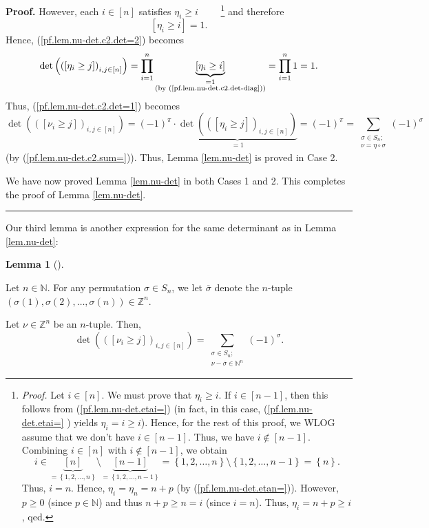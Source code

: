 \documentclass[numbers=enddot,12pt,final,onecolumn,notitlepage,english]{scrartcl}%
\theoremstyle{definition}
\newtheorem{lem}[theo]{Lemma}
\newenvironment{lemma}[1][]
{\begin{lem}[#1]\begin{leftbar}}
{\end{leftbar}\end{lem}}
\newenvironment{proof}[1][Proof]{\noindent\textbf{#1.} }{\ \rule{0.5em}{0.5em}}
\let\sumnonlimits\sum
\let\prodnonlimits\prod
\renewcommand{\sum}{\sumnonlimits\limits}
\renewcommand{\prod}{\prodnonlimits\limits}
\newenvironment{verlong}{}{}
\begin{document}
\begin{proof}
\begin{verlong}
However, each $i\in\left[  n\right]  $ satisfies $\eta_{i}\geq i$%
\ \ \ \ \footnote{\textit{Proof.} Let $i\in\left[  n\right]  $. We must prove
that $\eta_{i}\geq i$. If $i\in\left[  n-1\right]  $, then this follows from
(\ref{pf.lem.nu-det.etai=}) (in fact, in this case, (\ref{pf.lem.nu-det.etai=}%
) yields $\eta_{i}=i\geq i$). Hence, for the rest of this proof, we WLOG
assume that we don't have $i\in\left[  n-1\right]  $. Thus, we have
$i\notin\left[  n-1\right]  $. Combining $i\in\left[  n\right]  $ with
$i\notin\left[  n-1\right]  $, we obtain%
\[
i\in\underbrace{\left[  n\right]  }_{=\left\{  1,2,\ldots,n\right\}
}\setminus\underbrace{\left[  n-1\right]  }_{=\left\{  1,2,\ldots,n-1\right\}
}=\left\{  1,2,\ldots,n\right\}  \setminus\left\{  1,2,\ldots,n-1\right\}
=\left\{  n\right\}  .
\]
Thus, $i=n$. Hence, $\eta_{i}=\eta_{n}=n+p$ (by (\ref{pf.lem.nu-det.etan=})).
However, $p\geq0$ (since $p\in\mathbb{N}$) and thus $n+p\geq n=i$ (since
$i=n$). Thus, $\eta_{i}=n+p\geq i$, qed.} and therefore
\begin{equation}
\left[  \eta_{i}\geq i\right]  =1. \label{pf.lem.nu-det.c2.det-diag}%
\end{equation}
Hence, (\ref{pf.lem.nu-det.c2.det=2}) becomes%
\[
\det\left(  \left(  \left[  \eta_{i}\geq j\right]  \right)  _{i,j\in\left[
n\right]  }\right)  =\prod_{i=1}^{n}\underbrace{\left[  \eta_{i}\geq i\right]
}_{\substack{=1\\\text{(by (\ref{pf.lem.nu-det.c2.det-diag}))}}}=\prod
_{i=1}^{n}1=1.
\]
Thus, (\ref{pf.lem.nu-det.c2.det=1}) becomes%
\[
\det\left(  \left(  \left[  \nu_{i}\geq j\right]  \right)  _{i,j\in\left[
n\right]  }\right)  =\left(  -1\right)  ^{\pi}\cdot\underbrace{\det\left(
\left(  \left[  \eta_{i}\geq j\right]  \right)  _{i,j\in\left[  n\right]
}\right)  }_{=1}=\left(  -1\right)  ^{\pi}=\sum_{\substack{\sigma\in
S_{n};\\\nu=\eta\circ\sigma}}\left(  -1\right)  ^{\sigma}%
\]
(by (\ref{pf.lem.nu-det.c2.sum=})). Thus, Lemma \ref{lem.nu-det} is proved in
Case 2. \medskip
\end{verlong}

We have now proved Lemma \ref{lem.nu-det} in both Cases 1 and 2. This
completes the proof of Lemma \ref{lem.nu-det}.
\end{proof}

Our third lemma is another expression for the same determinant as in Lemma
\ref{lem.nu-det}:

\begin{lemma}
\label{lem.nu-det2}Let $n\in\mathbb{N}$. For any permutation $\sigma\in S_{n}%
$, we let $\overline{\sigma}$ denote the $n$-tuple $\left(  \sigma\left(
1\right)  ,\sigma\left(  2\right)  ,\ldots,\sigma\left(  n\right)  \right)
\in\mathbb{Z}^{n}$.

Let $\nu\in\mathbb{Z}^{n}$ be an $n$-tuple. Then,%
\[
\det\left(  \left(  \left[  \nu_{i}\geq j\right]  \right)  _{i,j\in\left[
n\right]  }\right)  =\sum_{\substack{\sigma\in S_{n};\\\nu-\overline{\sigma
}\in\mathbb{N}^{n}}}\left(  -1\right)  ^{\sigma}.
\]

\end{lemma}
\end{document}
